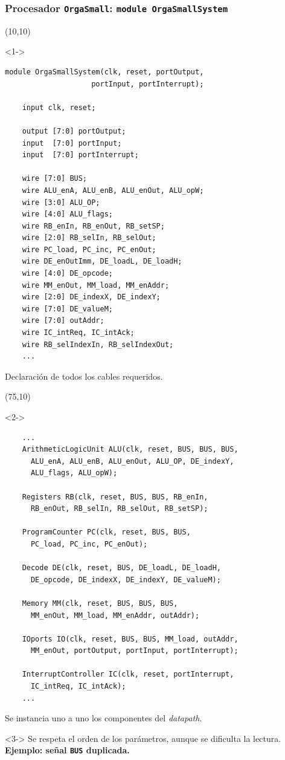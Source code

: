 \documentclass[aspectratio=169]{beamer}
\begin{document}
\begin{frame}[fragile,t]
    \frametitle{Procesador \texttt{OrgaSmall}: \texttt{module OrgaSmallSystem}}
    \begin{textblock}{60}(10,10)
    \begin{onlyenv}<1->
\lstset{basicstyle=\tiny}
\begin{lstlisting}
module OrgaSmallSystem(clk, reset, portOutput,
                    portInput, portInterrupt);

    input clk, reset;
    
    output [7:0] portOutput;
    input  [7:0] portInput;
    input  [7:0] portInterrupt;
 
    wire [7:0] BUS;
    wire ALU_enA, ALU_enB, ALU_enOut, ALU_opW;
    wire [3:0] ALU_OP;
    wire [4:0] ALU_flags;
    wire RB_enIn, RB_enOut, RB_setSP;
    wire [2:0] RB_selIn, RB_selOut;
    wire PC_load, PC_inc, PC_enOut;
    wire DE_enOutImm, DE_loadL, DE_loadH;
    wire [4:0] DE_opcode;
    wire MM_enOut, MM_load, MM_enAddr;
    wire [2:0] DE_indexX, DE_indexY;
    wire [7:0] DE_valueM;
    wire [7:0] outAddr;
    wire IC_intReq, IC_intAck;
    wire RB_selIndexIn, RB_selIndexOut;
    ...
\end{lstlisting}
    \small
    Declaración de todos los cables requeridos.
    \end{onlyenv}
    \end{textblock}
    \begin{textblock}{72}(75,10)
    \begin{onlyenv}<2->
\lstset{basicstyle=\tiny}
\begin{lstlisting}
    ...
    ArithmeticLogicUnit ALU(clk, reset, BUS, BUS, BUS, 
      ALU_enA, ALU_enB, ALU_enOut, ALU_OP, DE_indexY,
      ALU_flags, ALU_opW);
    
    Registers RB(clk, reset, BUS, BUS, RB_enIn,
      RB_enOut, RB_selIn, RB_selOut, RB_setSP);
    
    ProgramCounter PC(clk, reset, BUS, BUS,
      PC_load, PC_inc, PC_enOut);
    
    Decode DE(clk, reset, BUS, DE_loadL, DE_loadH,
      DE_opcode, DE_indexX, DE_indexY, DE_valueM);
        
    Memory MM(clk, reset, BUS, BUS, BUS,
      MM_enOut, MM_load, MM_enAddr, outAddr);

    IOports IO(clk, reset, BUS, BUS, MM_load, outAddr,
      MM_enOut, portOutput, portInput, portInterrupt);
        
    InterruptController IC(clk, reset, portInterrupt,
      IC_intReq, IC_intAck);
    ...
\end{lstlisting}
    \small
    Se instancia uno a uno los componentes del \emph{datapath}.\\
    \end{onlyenv}
    \begin{onlyenv}<3->
    \small
    \textcolor{verdeuca}{Se respeta el orden de los parámetros,} \textcolor{rojo}{aunque se dificulta la lectura. \textbf{Ejemplo: señal \texttt{BUS} duplicada.}}
    \end{onlyenv}
    \end{textblock}
\end{frame}
\end{document}
